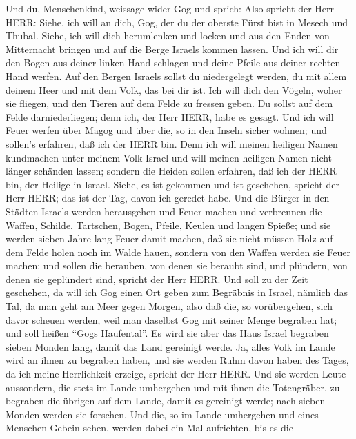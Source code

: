  Und du, Menschenkind, weissage wider Gog und sprich: Also
spricht der Herr HERR: Siehe, ich will an dich, Gog, der du der oberste
Fürst bist in Mesech und Thubal.  Siehe, ich will dich
herumlenken und locken und aus den Enden von Mitternacht bringen und auf
die Berge Israels kommen lassen.  Und ich will dir den Bogen
aus deiner linken Hand schlagen und deine Pfeile aus deiner rechten Hand
werfen.  Auf den Bergen Israels sollst du niedergelegt
werden, du mit allem deinem Heer und mit dem Volk, das bei dir ist. Ich
will dich den Vögeln, woher sie fliegen, und den Tieren auf dem Felde zu
fressen geben.  Du sollst auf dem Felde darniederliegen;
denn ich, der Herr HERR, habe es gesagt.  Und ich will Feuer
werfen über Magog und über die, so in den Inseln sicher wohnen; und
sollen's erfahren, daß ich der HERR bin.  Denn ich will
meinen heiligen Namen kundmachen unter meinem Volk Israel und will
meinen heiligen Namen nicht länger schänden lassen; sondern die Heiden
sollen erfahren, daß ich der HERR bin, der Heilige in Israel.
 Siehe, es ist gekommen und ist geschehen, spricht der Herr
HERR; das ist der Tag, davon ich geredet habe.  Und die
Bürger in den Städten Israels werden herausgehen und Feuer machen und
verbrennen die Waffen, Schilde, Tartschen, Bogen, Pfeile, Keulen und
langen Spieße; und sie werden sieben Jahre lang Feuer damit machen,
 daß sie nicht müssen Holz auf dem Felde holen noch im
Walde hauen, sondern von den Waffen werden sie Feuer machen; und sollen
die berauben, von denen sie beraubt sind, und plündern, von denen sie
geplündert sind, spricht der Herr HERR.  Und soll zu der
Zeit geschehen, da will ich Gog einen Ort geben zum Begräbnis in Israel,
nämlich das Tal, da man geht am Meer gegen Morgen, also daß die, so
vorübergehen, sich davor scheuen werden, weil man daselbst Gog mit
seiner Menge begraben hat; und soll heißen ``Gogs Haufental''.
 Es wird sie aber das Haus Israel begraben sieben Monden
lang, damit das Land gereinigt werde.  Ja, alles Volk im
Lande wird an ihnen zu begraben haben, und sie werden Ruhm davon haben
des Tages, da ich meine Herrlichkeit erzeige, spricht der Herr HERR.
 Und sie werden Leute aussondern, die stets im Lande
umhergehen und mit ihnen die Totengräber, zu begraben die übrigen auf
dem Lande, damit es gereinigt werde; nach sieben Monden werden sie
forschen.  Und die, so im Lande umhergehen und eines
Menschen Gebein sehen, werden dabei ein Mal aufrichten, bis es die
